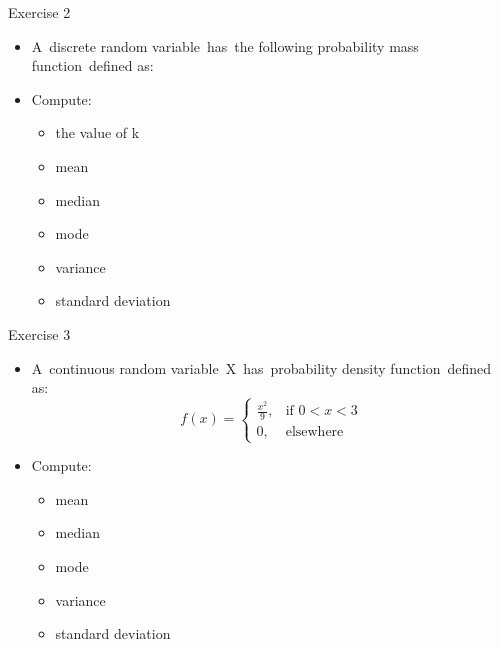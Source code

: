 \documentclass{beamer}
\begin{document}
\begin{frame}
{\centerline{Exercise 2}}
\begin{itemize}
    \item A discrete random variable has the following probability mass function defined as:
    \newline
    \begin{center}
    \end{center}

    \newline
    \item Compute:
    \begin{itemize}
        \item the value of k
        \item mean
        \item median
        \item mode
        \item variance
        \item standard deviation
    \end{itemize}
\end{itemize}
\end{frame}


\begin{frame}
{\centerline{Exercise 3}}
\begin{itemize}
    \item A continuous random variable X has probability density function defined as:
    \begin{equation*}
        
  f(x)=\left\{
        \begin{array}{ll}
             \frac{x^{2}}{9}, & \mbox{if $0<x<3$}\\
                0, & \mbox{elsewhere}
         \end{array}
        \right.
    \end{equation*}
    \newline
    \item Compute:
    \begin{itemize}
        \item mean
        \item median
        \item mode
        \item variance
        \item standard deviation
    \end{itemize}
\end{itemize}
\end{frame}
\end{document}
